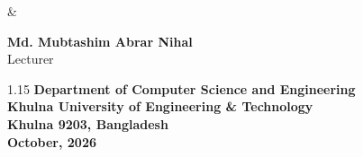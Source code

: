 \documentclass[11pt,a4paper]{article}
\newcommand{\SubmissionDate}{October, 2026}
\newcommand{\TeacherTwo}{Md. Mubtashim Abrar Nihal}
\newcommand{\TeacherTwoTitle}{Lecturer}
\begin{document}
\begin{titlepage}
\begin{center}
        \vspace{20pt}
        {\fontsize{14}{16}\selectfont \&}\par
        \vspace{6pt}
        \vspace{2pt}

        {\fontsize{14}{15}\selectfont \textbf{\TeacherTwo}}\\
        \vspace{2pt}
        {\fontsize{11}{14}\selectfont \TeacherTwoTitle}
        \vspace{30pt}

        \begin{spacing}{1.15}
            {\fontsize{12}{16}\selectfont
            \textbf{Department of Computer Science and Engineering}}\\
            {\fontsize{12}{16}\selectfont
            \textbf{Khulna University of Engineering \& Technology}}\\
            {\fontsize{12}{16}\selectfont
            \textbf{Khulna 9203, Bangladesh}}\\
            {\fontsize{12}{16}\selectfont
            \textbf{\SubmissionDate}}
        \end{spacing}

    \end{center}
\end{titlepage}
\clearpage
{}
\setcounter{page}{1}
\onehalfspacing
\normalsize

\end{document}
